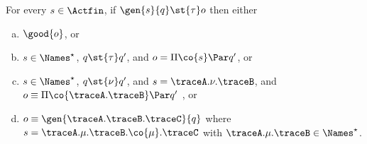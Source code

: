 \begin{lemma}
  \label{lem:gs-tau}
  For every $s \in \Actfin$,
  if $\gen{s}{q} \st{ \tau } o$
  then either
  \begin{enumerate}[(a)]
  \item\label{pt:gs-tau-1} $ \good{o}$, or
  \item\label{pt:gs-tau-2} $s \in \Names^\star$, $q \st{\tau} q'$, and $o = \Pi \co{s} \Par q'$, or
  \item\label{pt:gs-tau-3} $s \in \Names^\star$, $q \st{\nu} q'$, and $s =  \traceA . \nu . \traceB$, and $o \equiv \Pi \co{\traceA.\traceB} \Par q'$ , or
  \item\label{pt:gs-tau-4} $o \equiv \gen{\traceA.\traceB.\traceC}{q}$ where $ s = \traceA . \mu . \traceB . \co{\mu} . \traceC$ with $ \traceA . \mu  . \traceB \in \Names^\star$.
  \end{enumerate}
\end{lemma}
